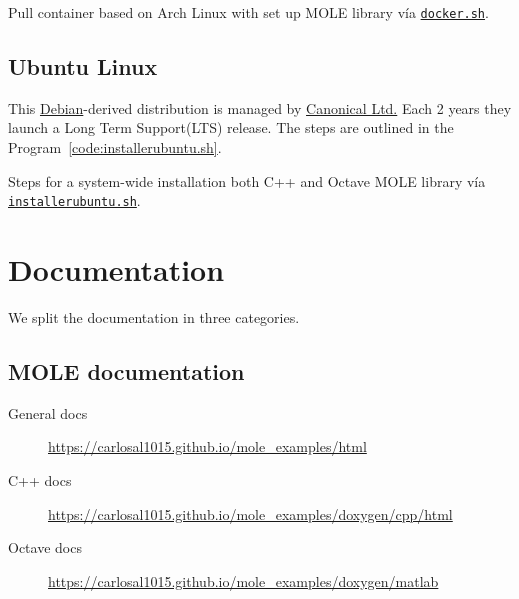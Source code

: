 \begin{listing}[ht!]
	\tiny
	\centering
	\caption{Pull container based on Arch Linux with set up MOLE
		library vía \href{https://raw.githubusercontent.com/carlosal1015/mole_examples/main/tutorial/docker.sh}{\texttt{docker.sh}}.}
	\label{code:docker.sh}
\end{listing}

\section{Ubuntu Linux}

This \href{https://www.debian.org}{Debian}-derived distribution is
managed by \href{https://canonical.com}{Canonical Ltd.}
Each 2 years they launch a Long Term Support(LTS) release.
The steps are outlined in the Program~\ref{code:installerubuntu.sh}.

\begin{listing}[ht!]
	\tiny
	\centering
	\caption{Steps for a system-wide installation both C++ and Octave
		MOLE library vía \href{https://raw.githubusercontent.com/carlosal1015/mole_examples/main/tutorial/installerubuntu.sh}{\texttt{installerubuntu.sh}}.}
	\label{code:installerubuntu.sh}
\end{listing}

\chapter{Documentation}

We split the documentation in three categories.

\section{MOLE documentation}

\begin{description}
	\item[General docs]

	      \url{https://carlosal1015.github.io/mole_examples/html}

	\item[C++ docs]

	      \url{https://carlosal1015.github.io/mole_examples/doxygen/cpp/html}

	\item[Octave docs]

	      \url{https://carlosal1015.github.io/mole_examples/doxygen/matlab}
\end{description}

